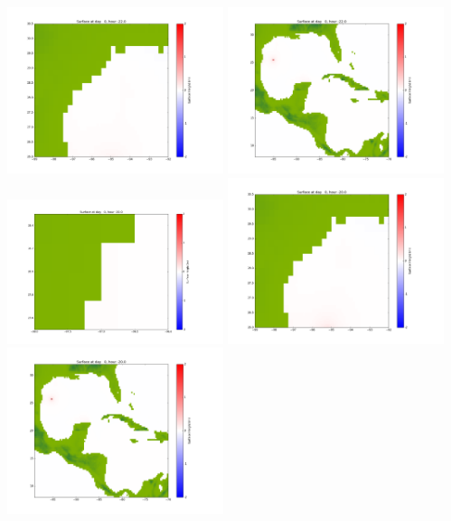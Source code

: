 \documentclass[11pt]{article}
\begin{document}
\includegraphics[width=0.475\textwidth]{frame0013fig1002.png}
\vskip 10pt 
\includegraphics[width=0.475\textwidth]{frame0013fig1003.png}
\vskip 10pt 
\includegraphics[width=0.475\textwidth]{frame0014fig1001.png}
\includegraphics[width=0.475\textwidth]{frame0014fig1002.png}
\vskip 10pt 
\includegraphics[width=0.475\textwidth]{frame0014fig1003.png}
\end{document}
